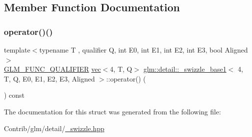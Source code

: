 \subsection{Member Function Documentation}
\mbox{\label{structglm_1_1detail_1_1__swizzle__base1_3_014_00_01_t_00_01_q_00_01_e0_00_01_e1_00_01_e2_00_01_e3_00_01_aligned_01_4_a4f7066f4879ee4e9a999748d556c9198}} 
\subsubsection{\texorpdfstring{operator()()}{operator()()}}
{\footnotesize\ttfamily template$<$typename T , qualifier Q, int E0, int E1, int E2, int E3, bool Aligned$>$ \\
\mbox{\hyperlink{setup_8hpp_a33fdea6f91c5f834105f7415e2a64407}{G\+L\+M\+\_\+\+F\+U\+N\+C\+\_\+\+Q\+U\+A\+L\+I\+F\+I\+ER}} \mbox{\hyperlink{structglm_1_1vec}{vec}}$<$4, T, Q$>$ \mbox{\hyperlink{structglm_1_1detail_1_1__swizzle__base1}{glm\+::detail\+::\+\_\+swizzle\+\_\+base1}}$<$ 4, T, Q, E0, E1, E2, E3, Aligned $>$\+::operator() (\begin{DoxyParamCaption}{ }\end{DoxyParamCaption}) const\hspace{0.3cm}{\ttfamily [inline]}}



The documentation for this struct was generated from the following file\+:\begin{DoxyCompactItemize}
\item 
Contrib/glm/detail/\mbox{\hyperlink{__swizzle_8hpp}{\+\_\+swizzle.\+hpp}}\end{DoxyCompactItemize}
